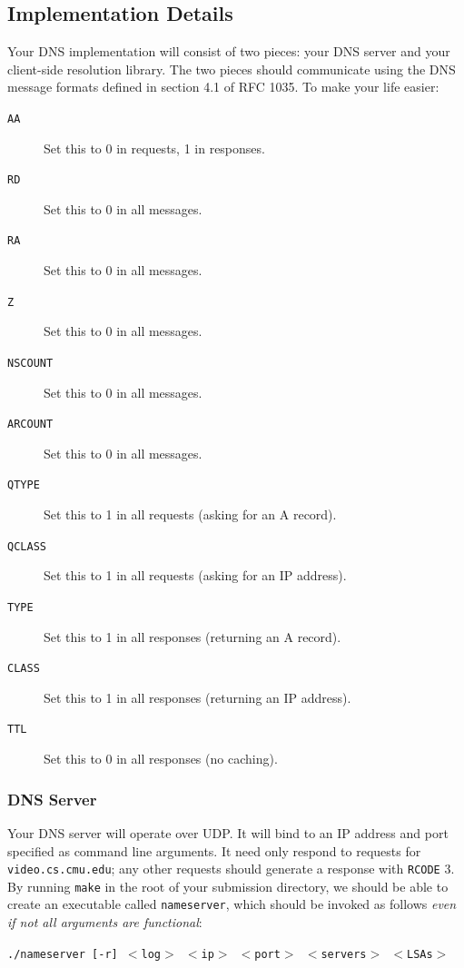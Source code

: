\documentclass{article}
\newcommand{\theurl}{\texttt{video.cs.cmu.edu}}
\begin{document}
\subsection{Implementation Details}
\label{sec:dns-details}

Your DNS implementation will consist of two pieces: your DNS server and your
client-side resolution library. The two pieces should communicate using the DNS
message formats defined in section 4.1 of RFC 1035. To make your life easier:

\begin{description}
	\item[\texttt{AA}] Set this to 0 in requests, 1 in responses.
	\item[\texttt{RD}] Set this to 0 in all messages.
	\item[\texttt{RA}] Set this to 0 in all messages.
	\item[\texttt{Z}] Set this to 0 in all messages.
	\item[\texttt{NSCOUNT}] Set this to 0 in all messages.
	\item[\texttt{ARCOUNT}] Set this to 0 in all messages.
	\item[\texttt{QTYPE}] Set this to 1 in all requests (asking for an A record).
	\item[\texttt{QCLASS}] Set this to 1 in all requests (asking for an IP address).
	\item[\texttt{TYPE}] Set this to 1 in all responses (returning an A record).
	\item[\texttt{CLASS}] Set this to 1 in all responses (returning an IP address).
	\item[\texttt{TTL}] Set this to 0 in all responses (no caching).
\end{description}


\subsubsection{DNS Server}
\label{sec:dns-server-details}

Your DNS server will operate over UDP. It will bind to an IP address and port
specified as command line arguments. It need only respond to requests for
\theurl; any other requests should generate a response with \texttt{RCODE} 3.
By running \texttt{make} in the root of your submission directory, we should be
able to create an executable called \texttt{nameserver}, which should be
invoked as follows \emph{even if not all arguments are functional}:
\begin{center}
	\texttt{./nameserver [-r] $<$log$>$ $<$ip$>$ $<$port$>$ $<$servers$>$ $<$LSAs$>$}
\end{center}
\end{document}
